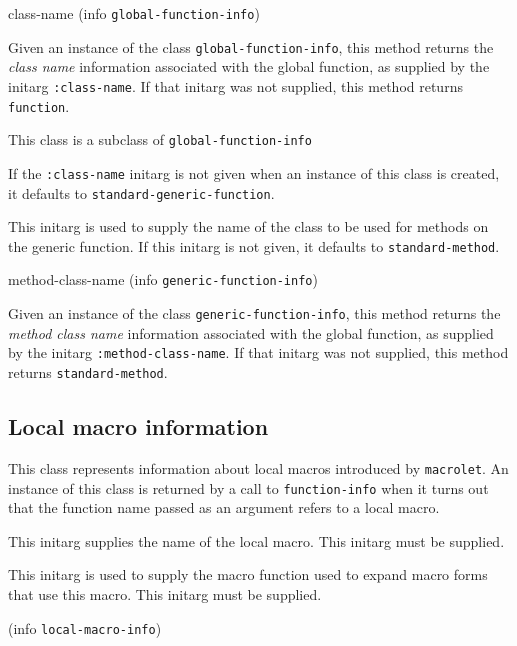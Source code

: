 \Defmethod class-name {(info {\tt global-function-info})}

Given an instance of the class \texttt{global-function-info}, this
method returns the \emph{class name} information
associated with the global function, as supplied by the initarg
\texttt{:class-name}.  If that initarg was not supplied, this
method returns \texttt{function}.


This class is a subclass of \texttt{global-function-info}

If the \texttt{:class-name} initarg is not given when an instance of
this class is created, it defaults to
\texttt{standard-generic-function}.


This initarg is used to supply the name of the class to be used for
methods on the generic function.  If this initarg is not given, it
defaults to \texttt{standard-method}.

\Defmethod method-class-name {(info {\tt generic-function-info})}

Given an instance of the class \texttt{generic-function-info}, this
method returns the \emph{method class name} information
associated with the global function, as supplied by the initarg
\texttt{:method-class-name}.  If that initarg was not supplied, this
method returns \texttt{standard-method}.

\subsection{Local macro information}


This class represents information about local macros introduced by
\texttt{macrolet}.  An instance of this class is returned by a call to
\texttt{function-info} when it turns out that the function name passed
as an argument refers to a local macro.


This initarg supplies the name of the local macro.  This initarg
must be supplied.


This initarg is used to supply the macro function used to expand macro
forms that use this macro.  This initarg must be supplied. 

 {(info {\tt local-macro-info})}

